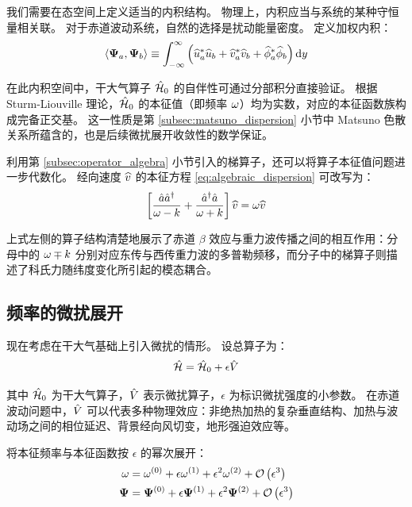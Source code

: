 我们需要在态空间上定义适当的内积结构。
物理上，内积应当与系统的某种守恒量相关联。
对于赤道波动系统，自然的选择是扰动能量密度。
定义加权内积：
\begin{equation}
    \langle \bm{\Psi}_a, \bm{\Psi}_b \rangle \equiv \int_{-\infty}^{\infty} \left( \widehat{u}_a^* \widehat{u}_b + \widehat{v}_a^* \widehat{v}_b + \widehat{\phi}_a^* \widehat{\phi}_b \right) \mathrm{d} y
    \label{eq:inner_product_horizontal}
\end{equation}

在此内积空间中，干大气算子 $\hat{\mathcal{H}}_0$ 的自伴性可通过分部积分直接验证。
根据 Sturm-Liouville 理论，$\hat{\mathcal{H}}_0$ 的本征值（即频率 $\omega$）均为实数，对应的本征函数族构成完备正交基。
这一性质是第 \ref{subsec:matsuno_dispersion} 小节中 Matsuno 色散关系所蕴含的，也是后续微扰展开收敛性的数学保证。

利用第 \ref{subsec:operator_algebra} 小节引入的梯算子，还可以将算子本征值问题进一步代数化。
经向速度 $\widehat{v}$ 的本征方程 \eqref{eq:algebraic_dispersion} 可改写为：
\begin{equation}
    \left[ \frac{\hat{a}\hat{a}^{\dagger}}{\omega - k} + \frac{\hat{a}^{\dagger}\hat{a}}{\omega + k} \right] \widehat{v} = \omega \widehat{v}
    \label{eq:v_operator_eigen}
\end{equation}

上式左侧的算子结构清楚地展示了赤道 $\beta$ 效应与重力波传播之间的相互作用：分母中的 $\omega \mp k$ 分别对应东传与西传重力波的多普勒频移，而分子中的梯算子则描述了科氏力随纬度变化所引起的模态耦合。

\subsection{频率的微扰展开}
\label{subsec:frequency_perturbation}

现在考虑在干大气基础上引入微扰的情形。
设总算子为：
\begin{equation}
    \hat{\mathcal{H}} = \hat{\mathcal{H}}_0 + \epsilon \hat{V}
    \label{eq:perturbed_operator}
\end{equation}

其中 $\hat{\mathcal{H}}_0$ 为干大气算子，$\hat{V}$ 表示微扰算子，$\epsilon$ 为标识微扰强度的小参数。
在赤道波动问题中，$\hat{V}$ 可以代表多种物理效应：非绝热加热的复杂垂直结构、加热与波动场之间的相位延迟、背景经向风切变，地形强迫效应等。

将本征频率与本征函数按 $\epsilon$ 的幂次展开：
\begin{align}
    \omega &= \omega^{(0)} + \epsilon \omega^{(1)} + \epsilon^2 \omega^{(2)} + \mathcal{O}\left(\epsilon^3\right) \label{eq:frequency_expansion} \\
    \bm{\Psi} &= \bm{\Psi}^{(0)} + \epsilon \bm{\Psi}^{(1)} + \epsilon^2 \bm{\Psi}^{(2)} + \mathcal{O}\left(\epsilon^3\right) \label{eq:state_expansion}
\end{align}

